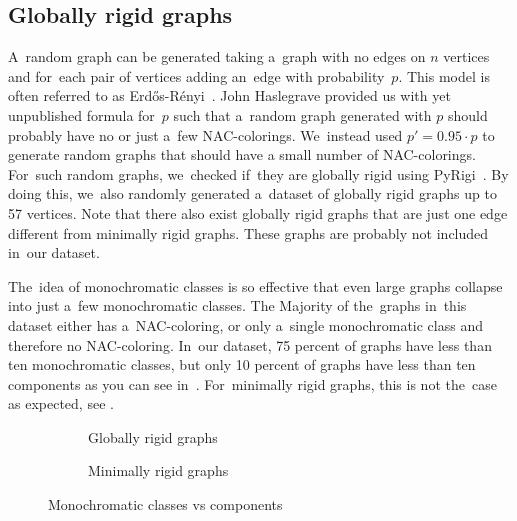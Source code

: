 \subsection*{Globally rigid graphs}

A~random graph can be generated taking a~graph with no edges on \( n \) vertices
and for~each pair of vertices adding an~edge with probability~\( p \).
This model is often referred to as Erdős-Rényi~\cite{random_gnp}.
%
John Haslegrave provided us with yet unpublished formula for~\( p \)
such that a~random graph generated with \( p \)
should probably have no or just a~few NAC-colorings.
%
We~instead used \( p' = 0.95\cdot p \) to generate random graphs that
should have a small number of NAC-colorings.
For~such random graphs, we~checked if~they are globally rigid using PyRigi~\cite{pyrigi}.
%
By doing this, we~also randomly generated a~dataset of globally rigid graphs
up to 57 vertices.
%
Note that there also exist globally rigid graphs
that are just one edge different from minimally rigid graphs.
These graphs are probably not included in~our dataset.

The~idea of monochromatic classes is so effective
that even large graphs collapse into just a~few monochromatic classes.
The Majority of the~graphs in~this dataset either has a~NAC-coloring,
or only a~single monochromatic class and therefore no NAC-coloring.
In~our dataset, 75 percent of graphs have less than ten	monochromatic classes,
but only 10 percent of graphs have less than ten \trcon{} components
as you can see in~.
For~minimally rigid graphs, this is not the~case as expected, see
.
%
\begin{figure}[h!]
	\centering
	\begin{subfigure}{0.48\textwidth}
		\centering
		\scalebox{0.6}{}
		\caption[Monoch. classes vs tr. con. components for~globally rigid]{%
			\centering Globally rigid graphs}%
		\label{fig:monochrom_vs_triangle_globally_rigid}
	\end{subfigure}
	\hfill
	\begin{subfigure}{0.48\textwidth}
		\centering
		\scalebox{0.6}{}
		\caption[Monoch. classes vs tr. con. components for~minimally rigid]{%
			\centering Minimally rigid graphs}%
		\label{fig:monochrom_vs_triangle_minimally_rigid}
	\end{subfigure}
	\caption{Monochromatic classes vs \trcon{} components}%
	\label{fig:monochrom_vs_triangle}
\end{figure}

